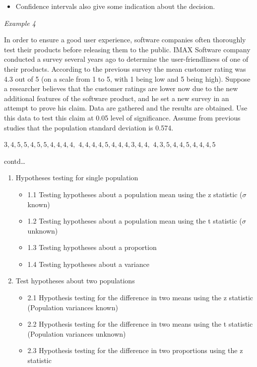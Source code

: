 \documentclass[]{book}
\providecommand{\tightlist}{%
  \setlength{\itemsep}{0pt}\setlength{\parskip}{0pt}}
\begin{document}
\begin{itemize}
\tightlist
\item
  Confidence intervals also give some indication about the decision.
\end{itemize}

\newpage

\emph{Example 4}

In order to ensure a good user experience, software companies often thoroughly test their products before releasing them to the public. IMAX Software company conducted a survey several years ago to determine the user-friendliness of one of their products. According to the previous survey the mean customer rating was 4.3 out of 5 (on a scale from 1 to 5, with 1 being low and 5 being high). Suppose a researcher believes that the customer ratings are lower now due to the new additional features of the software product, and he set a new survey in an attempt to prove his claim. Data are gathered and the results are obtained. Use this data to test this claim at 0.05 level of significance. Assume from previous studies that the population standard deviation is 0.574.

\(3,4,5,5,4,5,5,4,4,4,4,\) \newline
\(4,4,4,4,5,4,4,4,3,4,4,\) \newline
\(4,3,5,4,4,5,4,4,4,5\)

\newpage

contd\ldots{}

\newpage

\begin{enumerate}
\def\labelenumi{\arabic{enumi}.}
\item
  Hypotheses testing for single population

  \begin{itemize}
  \item
    1.1 Testing hypotheses about a population mean using the z statistic (\(\sigma\) known)
  \item
    1.2 Testing hypotheses about a population mean using the t statistic (\(\sigma\) unknown)
  \item
    1.3 Testing hypotheses about a proportion
  \item
    1.4 Testing hypotheses about a variance
  \end{itemize}
\item
  Test hypotheses about two populations

  \begin{itemize}
  \item
    2.1 Hypothesis testing for the difference in two means using the z statistic (Population variances known)
  \item
    2.2 Hypothesis testing for the difference in two means using the t statistic (Population variances unknown)
  \item
    2.3 Hypothesis testing for the difference in two proportions using the z statistic
  \end{itemize}
\end{enumerate}
\end{document}
